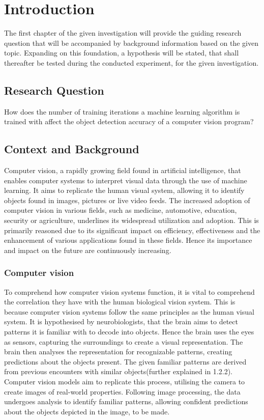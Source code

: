 

\section{Introduction}
The first chapter of the given investigation will provide the guiding research question that will be accompanied by background information based on the given topic. Expanding on this foundation, a hypothesis will be stated, that shall thereafter be tested during the conducted experiment, for the given investigation.  

\subsection{Research Question}
How does the number of training iterations a machine learning algorithm is trained with affect the object detection accuracy of a computer vision program?

\subsection{Context and Background}
Computer vision, a rapidly growing field found in artificial intelligence, that enables computer systems to interpret visual data through the use of machine learning. It aims to replicate the human visual system, allowing it to identify objects found in images, pictures or live video feeds. The increased adoption of computer vision in various fields, such as medicine, automotive, education, security or agriculture, underlines its widespread utilization and adoption. This is primarily reasoned due to its significant impact on efficiency, effectiveness and the enhancement of various applications found in these fields. Hence its importance and impact on the future are continuously increasing. 

\subsubsection{Computer vision}
To comprehend how computer vision systems function, it is vital to comprehend the correlation they have with the human biological vision system. This is because computer vision systems follow the same principles as the human visual system. It is hypothesised by neurobiologists, that the brain aims to detect patterns it is familiar with to decode into objects. Hence the brain uses the eyes as sensors, capturing the surroundings to create a visual representation. The brain then analyses the representation for recognizable patterns, creating predictions about the objects present. The given familiar patterns are derived from previous encounters with similar objects(further explained in 1.2.2). Computer vision models aim to replicate this process, utilising the camera to create images of real-world properties. Following image processing, the data undergoes analysis to identify familiar patterns, allowing confident predictions about the objects depicted in the image, to be made.

